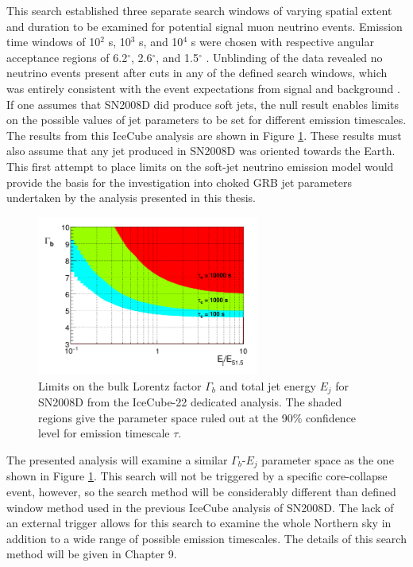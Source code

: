 \documentclass{gatech-thesis}
\begin{document}
This search established three separate search windows of varying spatial extent and duration to be examined for potential signal muon neutrino events. Emission time windows of 10$^2$ s, 10$^3$ s, and 10$^4$ s were chosen with respective angular acceptance regions of 6.2$^{\circ}$, 2.6$^{\circ}$, and 1.5$^{\circ}$ \cite{2011A&A...527A..28I}. Unblinding of the data revealed no neutrino events present after cuts in any of the defined search windows, which was entirely consistent with the event expectations from signal and background \cite{2011A&A...527A..28I}. If one assumes that SN2008D did produce soft jets, the null result enables limits on the possible values of jet parameters to be set for different emission timescales. The results from this IceCube analysis are shown in Figure \ref{fig:SN2008D}. These results must also assume that any jet produced in SN2008D was oriented towards the Earth. This first attempt to place limits on the soft-jet neutrino emission model would provide the basis for the investigation into choked GRB jet parameters undertaken by the analysis presented in this thesis.
\begin{figure}[ht]
  \begin{center}
    \includegraphics[width=0.65\textwidth,keepaspectratio]{SN2008D_ICLimits.png}
  \end{center}
  \caption[IceCube-22 Limits on SN2008D]{Limits on the bulk Lorentz factor $\Gamma_b$ and total jet energy $E_j$ for SN2008D from the IceCube-22 dedicated analysis. The shaded regions give the parameter space ruled out at the 90$\%$ confidence level for emission timescale $\tau$.}
  \label{fig:SN2008D}
\end{figure}
The presented analysis will examine a similar $\Gamma_b$-$E_j$ parameter space as the one shown in Figure \ref{fig:SN2008D}. This search will not be triggered by a specific core-collapse event, however, so the search method will be considerably different than defined window method used in the previous IceCube analysis of SN2008D. The lack of an external trigger allows for this search to examine the whole Northern sky in addition to a wide range of possible emission timescales. The details of this search method will be given in Chapter 9.
\end{document}
